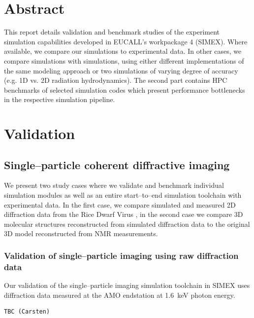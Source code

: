 \documentclass[10pt]{scrartcl}
\begin{document}
\section*{Abstract}
%
This report details validation and benchmark studies of the experiment simulation capabilities
developed in EUCALL's workpackage 4 (SIMEX). Where available, we compare our
simulations to experimental data. In other cases, we compare simulations with
simulations, using either different implementations of the same modeling
approach or two simulations of varying degree of accuracy (e.g. 1D vs. 2D
radiation hydrodynamics). The second part contains HPC benchmarks of selected
simulation codes which present performance bottlenecks in the respective
simulation pipeline.
%
\tableofcontents
%
\section{Validation}%
\subsection{Single--particle coherent diffractive imaging\label{sec:single_particle_imaging}}
We present two study cases where we validate and benchmark individual simulation
modules as well as an entire start--to--end simulation toolchain with
experimental data. In the first case, we compare simulated and measured 2D
diffraction data from the Rice Dwarf Virus \cite{Munke2016}, in the second case
we compare 3D molecular structures reconstructed from simulated diffraction data
to the original 3D model reconstructed from NMR \cite{Schlessman1998}
measurements.
\subsubsection{Validation of single--particle imaging using raw diffraction data }
Our validation of the single--particle imaging simulation toolchain in SIMEX
uses diffraction data measured at the AMO endstation at
\SI{1.6}{\kilo\electronvolt} photon energy.
%
\begin{verbatim}
TBC (Carsten)
\end{verbatim}
%
\end{document}
